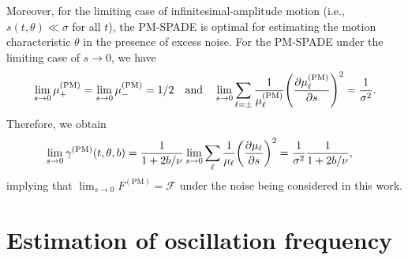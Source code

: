 \documentclass[aps,pra,10pt,showpacs,amsmath,amssymb,floatfix,superscriptaddress,twocolumn]{revtex4-2}
\begin{document}
Moreover, for the limiting case of infinitesimal-amplitude motion (i.e., \(s(t,\theta) \ll \sigma\) for all \(t\)), the PM-SPADE is optimal for estimating the motion characteristic \(\theta\) in the presence of excess noise.
For the PM-SPADE under the limiting case of \(s\to 0\), we have
\begin{equation}
    \lim_{s\to0} \mu_+^{\mathrm{(PM)}} = \lim_{s\to0} \mu_-^{\mathrm{(PM)}} = 1/2 \qand
    \lim_{s\to0} \sum_{\ell=\pm} \frac1{\mu_\ell^{\mathrm{(PM)}}} \qty(\pdv{\mu_\ell^{\mathrm{(PM)}}}{s})^2 = \frac1{\sigma^2}.
\end{equation}
Therefore, we obtain
\begin{align}
    \lim_{s\to0}\gamma^{\mathrm{(PM)}}(t, \theta, b)
    &=  \frac{1}{1+2b/\nu} \lim_{s\to0} \sum_\ell \frac{1}{\mu_\ell}\qty(\pdv{\mu_\ell}{s})^2
    = \frac{1}{\sigma^2}\frac{1}{1+2b/\nu},
\end{align}
implying that \(\lim_{s\to0}{F^\mathrm{(PM)}} = \mathcal{F}\) under the noise being considered in this work.



\section{Estimation of oscillation frequency}
\end{document}
